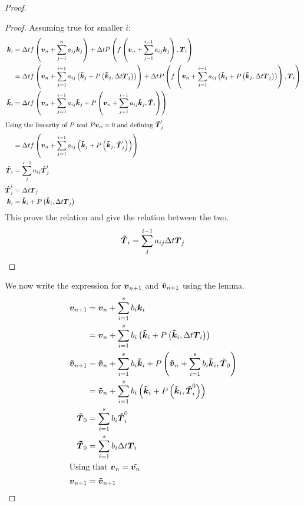 \begin{proof}
\begin{proof}
Assuming true for smaller $i$:
\begin{align*}
  {\boldsymbol {k}}_{i}&=\Delta tf\left({\boldsymbol {v}}_n+\sum_{j=1}^{n}a_{ij}{\boldsymbol {k}}_{j}\right)+\Delta tP\left(f\left({\boldsymbol {v}}_n+\sum_{j=1}^{i-1}a_{ij}{\boldsymbol {k}}_{j}\right),{\boldsymbol {T}}_{i}\right)\\
  &=\Delta tf\left({\boldsymbol {v}}_n+\sum_{j=1}^{i-1}a_{ij}\left({\boldsymbol {\tilde{k}}}_{j}+P\left({\boldsymbol {\tilde{k}}}_{j},\Delta t {\boldsymbol {T}}_{j}\right)\right)\right)+\Delta tP\left(f\left({\boldsymbol {v}}_n+\sum_{j=1}^{i-1}a_{ij}\left({\boldsymbol {\tilde{k}}}_{j}+P\left({\boldsymbol {\tilde{k}}}_{j},\Delta t {\boldsymbol {T}}_{j}\right)\right)\right),{\boldsymbol {T}}_{i}\right)\\
  {\boldsymbol {\tilde{k}}}_{i}&=\Delta tf\left({\boldsymbol {v}}_n+\sum_{j=1}^{i-1}a_{ij}{\boldsymbol {\tilde{k}}}_{j}+P\left({\boldsymbol {v}}_n+\sum_{j=1}^{i-1}a_{ij}{\boldsymbol {\tilde{k}}}_{j},{\boldsymbol {{\boldsymbol {\tilde{T}}}}}_{i}\right)\right)\\
  \intertext{Using the linearity of $P$ and $P{\boldsymbol {v}}_n=0$ and defining ${\boldsymbol {\hat{T}}}_{j}^i$}
  &=\Delta tf\left({\boldsymbol {v}}_n+\sum_{j=1}^{i-1}a_{ij}\left({\boldsymbol {\tilde{k}}}_{j}+P\left({\boldsymbol {\tilde{k}}}_{j},{\boldsymbol {\hat{T}}}_{j}^{i}\right)\right)\right)\\
  {\boldsymbol {\tilde{T}}}_i&=\sum_{j}^{i-1}a_{ij}{\boldsymbol {\hat{T}}}_{j}^{i}\\
  {\boldsymbol {\hat{T}}}^{i}_{j}&=\Delta t {\boldsymbol {T}}_{j}\\
  {\boldsymbol {k}}_{i}&={\boldsymbol {\tilde{k}}}_{i}+P\left({\boldsymbol {\tilde{k}}}_{i},\Delta t{\boldsymbol {T}}_j\right)
\end{align*}
This prove the relation and give the relation between the two.
\begin{equation}
  {\boldsymbol {\tilde{T}}}_i=\sum_{j}^{i-1}a_{ij}\Delta t {\boldsymbol {T}}_{j}
\end{equation}
\end{proof}

We now write the expression for ${\boldsymbol {v}}_{n+1}$ and ${\boldsymbol {\tilde{v}}}_{n+1}$ using the lemma.
\begin{align*}
{\boldsymbol {v}}_{n+1}&={\boldsymbol {v}}_{n}+\sum_{i=1}^{s}b_{i}{\boldsymbol {k}}_{i}\\
&={\boldsymbol {v}}_{n}+\sum_{i=1}^{s}b_{i}\left({\boldsymbol {\tilde{k}}}_{i}+P\left({\boldsymbol {\tilde{k}}}_{i},\Delta t{\boldsymbol {T}}_{i}\right)\right)\\
{\boldsymbol {\tilde{v}}}_{n+1}&={\boldsymbol {\tilde{v}}}_{n}+\sum_{i=1}^{s}b_{i}{\boldsymbol {\tilde{k}}}_{i}+P\left({\boldsymbol {\tilde{v}}}_{n}+\sum_{i=1}^{s}b_{i}{\boldsymbol {\tilde{k}}}_{i},{\boldsymbol {\tilde{T}}}_{0}\right)\\
&={\boldsymbol {\tilde{v}}}_{n}+\sum_{i=1}^{s}b_{i}\left({\boldsymbol {\tilde{k}}}_{i}+P\left({\boldsymbol {\tilde{k}}}_{i},{\boldsymbol {\hat{T}}}_{i}^{0}\right)\right)\\
{\boldsymbol {\tilde{T}}}_{0}&=\sum_{i=1}^{s}b_{i}{\boldsymbol {\hat{T}}}_{i}^{0}\\
{\boldsymbol {\tilde{T}}}_{0}&=\sum_{i=1}^{s}b_{i}\Delta t {\boldsymbol {T}}_{i}\\
\intertext{Using that ${\boldsymbol {v}}_{n}=\tilde{{\boldsymbol {v}}_{n}}$}
{\boldsymbol {v}}_{n+1}&={\boldsymbol {\tilde{v}}}_{n+1}
\end{align*}

\end{proof}

